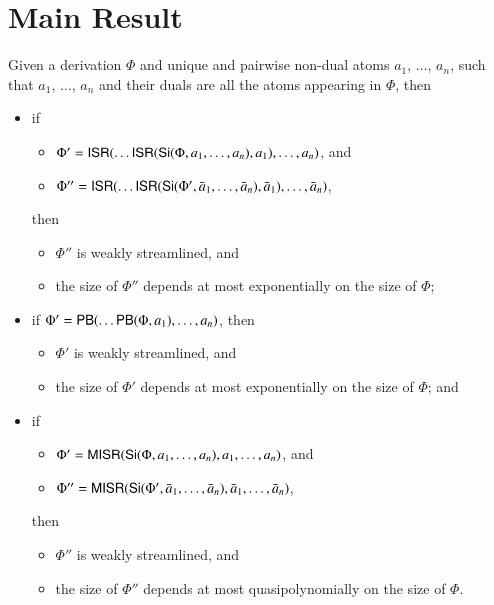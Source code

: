 \chapter{Main Result}\label{chapter:MainResult}

\begin{theorem}
Given a derivation $\Phi$ and unique and pairwise non-dual atoms $a_1$, $\dots$, $a_n$, such that $a_1$, $\dots$, $a_n$ and their duals are all the atoms appearing in $\Phi$, then
\begin{itemize}
\item if
\begin{itemize}
\item $\Phi'=\mathsf{ISR}(\dots\mathsf{ISR}(\mathsf{Si}(\Phi,a_1,\dots,a_n),a_1),\dots,a_n)$, and
\item $\Phi''=\mathsf{ISR}(\dots\mathsf{ISR}(\mathsf{Si}(\Phi',\bar a_1,\dots,\bar a_n),\bar a_1),\dots,\bar a_n)$,
\end{itemize}
then
\begin{itemize}
\item $\Phi''$ is weakly streamlined, and
\item the size of $\Phi''$ depends at most exponentially on the size of\/ $\Phi$;
\end{itemize}
\item if\/ $\Phi'=\mathsf{PB}(\dots\mathsf{PB}(\Phi,a_1),\dots,a_n)$, then
\begin{itemize}
\item $\Phi'$ is weakly streamlined, and
\item the size of\/ $\Phi'$ depends at most exponentially on the size of\/ $\Phi$; and
\end{itemize}
\item if
\begin{itemize}
\item $\Phi'=\mathsf{MISR}(\mathsf{Si}(\Phi,a_1,\dots,a_n),a_1,\dots,a_n)$, and
\item $\Phi''=\mathsf{MISR}(\mathsf{Si}(\Phi',\bar a_1,\dots,\bar a_n),\bar a_1,\dots,\bar a_n)$,
\end{itemize}
then
\begin{itemize}
\item $\Phi''$ is weakly streamlined, and
\item the size of\/ $\Phi''$ depends at most quasipolynomially on the size of\/ $\Phi$.
\end{itemize}
\end{itemize}
\end{theorem}